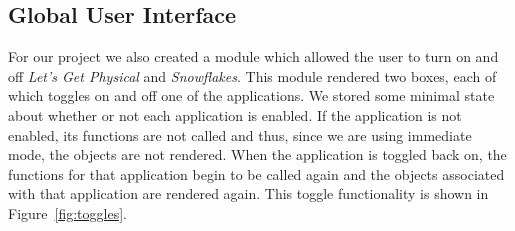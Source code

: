 \documentclass[conference,12pt]{IEEEtran}
\begin{document}
\subsection{Global User Interface}

For our project we also created a module which allowed the user to turn on and
off \textit{Let's Get Physical} and \textit{Snowflakes}. This module rendered
two boxes, each of which toggles on and off one of the applications. We stored
some minimal state about whether or not each application is enabled. If the
application is not enabled, its functions are not called and thus, since we are
using immediate mode, the objects are not rendered. When the application is
toggled back on, the functions for that application begin to be called again and
the objects associated with that application are rendered again. This toggle
functionality is shown in Figure~\ref{fig:toggles}.
\end{document}
